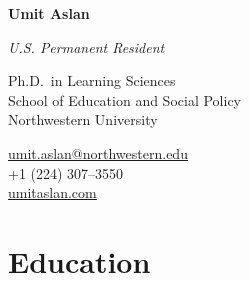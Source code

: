 \documentclass[11pt,letterpaper]{report} %
\newcommand{\myname}{Umit Aslan}
\newcommand{\namefont}[1]{{\normalfont\bfseries\Huge{#1}}}
\begin{document}
    \raggedright{}

    \namefont{\myname}

    \vspace{2pt}
    {\small\textit{U.S. Permanent Resident}\par}

    \vspace{0.8em}
    \begin{minipage}[t]{0.700\textwidth}
        Ph.D.\ in Learning Sciences \\
        School of Education and Social Policy \\
        Northwestern University
    \end{minipage}
    \begin{minipage}[t]{0.295\textwidth}
        \raggedleft{}
        \href{mailto:umit.aslan@northwestern.edu}{umit.aslan@northwestern.edu} \\
        +1 (224) 307--3550 \\
        \href{https://umitaslan.com}{umitaslan.com}
    \end{minipage}




    \section*{Education}
\end{document}
